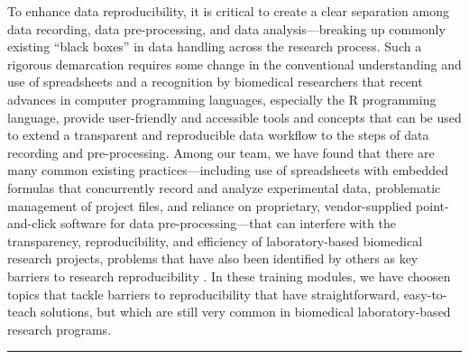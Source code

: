 \documentclass[]{tufte-book}
\begin{document}
To enhance data reproducibility, it is critical to create a clear separation
among data recording, data pre-processing, and data analysis---breaking up
commonly existing ``black boxes'' in data handling across the research process.
Such a rigorous demarcation requires some change in the conventional
understanding and use of spreadsheets and a recognition by biomedical
researchers that recent advances in computer programming languages, especially
the R programming language, provide user-friendly and accessible tools and
concepts that can be used to extend a transparent and reproducible data workflow
to the steps of data recording and pre-processing. Among our team, we have found
that there are many common existing practices---including use of spreadsheets
with embedded formulas that concurrently record and analyze experimental data,
problematic management of project files, and reliance on proprietary,
vendor-supplied point-and-click software for data pre-processing---that can
interfere with the transparency, reproducibility, and efficiency of
laboratory-based biomedical research projects, problems that have also been
identified by others as key barriers to research reproducibility
\citep{broman2018data, bryan2018excuse, ellis2018share, marwick2018packaging}. In
these training modules, we have choosen topics that tackle barriers to
reproducibility that have straightforward, easy-to-teach solutions, but which
are still very common in biomedical laboratory-based research programs.

\begin{center}\rule{0.5\linewidth}{0.5pt}\end{center}
\end{document}
